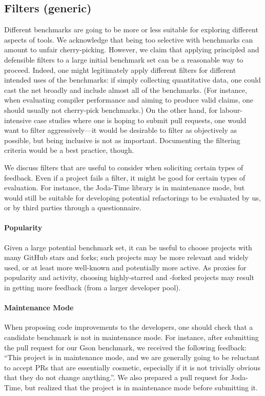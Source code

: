 \subsection{Filters (generic)}
Different benchmarks are going to be more or less suitable for exploring different aspects of tools. We acknowledge that being too selective with benchmarks can amount to unfair cherry-picking. However, we claim that applying principled and defensible filters to a large initial benchmark set can be a reasonable way to proceed. Indeed, one might legitimately apply different filters for different intended uses of the benchmarks: if simply collecting quantitative data, one could cast the net broadly and include almost all of the benchmarks. (For instance, when evaluating compiler performance and aiming to produce valid claims, one should usually not cherry-pick benchmarks.) On the other hand, for labour-intensive case studies where one is hoping to submit pull requests, one would want to filter aggressively---it would be desirable to filter as objectively as possible, but being inclusive is not as important. Documenting the filtering criteria would be a best practice, though.

We discuss filters that are useful to consider when soliciting certain types of feedback. Even if a project fails a filter, it might be good for certain types of evaluation. For instance, the Joda-Time library is in maintenance mode, but would still be suitable for developing potential refactorings to be evaluated by us, or by third parties through a questionnaire.

\paragraph{Popularity}
Given a large potential benchmark set, it can be useful to choose projects with many GitHub stars and forks; such projects may be more relevant and widely used, or at least more well-known and potentially more active. As proxies for popularity and activity, choosing highly-starred and -forked projects may result in getting more feedback (from a larger developer pool).

\paragraph{Maintenance Mode}
When proposing code improvements to the developers, one should check that a candidate benchmark is not in maintenance mode. For instance, after submitting the pull request for our Gson benchmark, we received the following feedback: ``This project is in maintenance mode, and we are generally going to be reluctant to accept PRs that are essentially cosmetic, especially if it is not trivially obvious that they do not change anything.''. We also prepared a pull request for Joda-Time, but realized that the project is in maintenance mode before submitting it.

